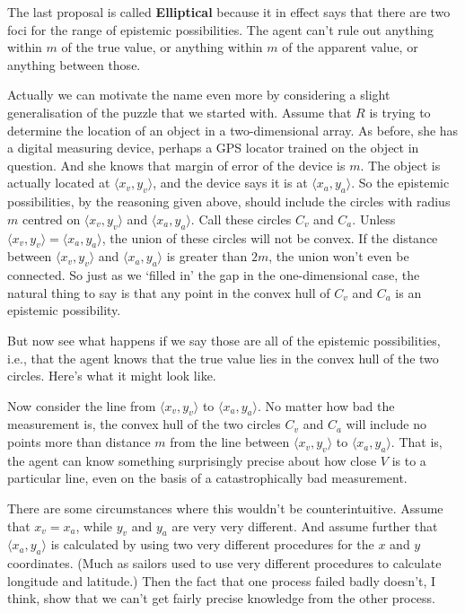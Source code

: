 \noindent The last proposal is called \textbf{Elliptical} because it in effect says that there are two foci for the range of epistemic possibilities. The agent can't rule out anything within $m$ of the true value, or anything within $m$ of the apparent value, or anything between those.

\newcommand{\locv}{\langle x_v, y_v \rangle}
\newcommand{\loca}{\langle x_a, y_a \rangle}


Actually we can motivate the name even more by considering a slight generalisation of the puzzle that we started with. Assume that $R$ is trying to determine the location of an object in a two-dimensional array. As before, she has a digital measuring device, perhaps a GPS locator trained on the object in question. And she knows that margin of error of the device is $m$.  The object is actually located at $\locv$, and the device says it is at $\loca$. So the epistemic possibilities, by the reasoning given above, should include the circles with radius $m$ centred on $\locv$ and $\loca$. Call these circles $C_v$ and $C_a$. Unless $\locv = \loca$, the union of these circles will not be convex. If the distance between $\locv$ and $\loca$ is greater than $2m$, the union won't even be connected. So just as we `filled in' the gap in the one-dimensional case, the natural thing to say is that any point in the convex hull of $C_v$ and $C_a$ is an epistemic possibility.

But now see what happens if we say those are all of the epistemic possibilities, i.e., that the agent knows that the true value lies in the convex hull of the two circles. Here's what it might look like.


Now consider the line from $\locv$ to $\loca$. No matter how bad the measurement is, the convex hull of the two circles $C_v$ and $C_a$ will include no points more than distance $m$ from the line between $\locv$ to $\loca$. That is, the agent can know something surprisingly precise about how close $V$ is to a particular line, even on the basis of a catastrophically bad measurement.

There are some circumstances where this wouldn't be counterintuitive. Assume that $x_v = x_a$, while $y_v$ and $y_a$ are very very different. And assume further that $\loca$ is calculated by using two very different procedures for the $x$ and $y$ coordinates. (Much as sailors used to use very different procedures to calculate longitude and latitude.) Then the fact that one process failed badly doesn't, I think, show that we can't get fairly precise knowledge from the other process.

